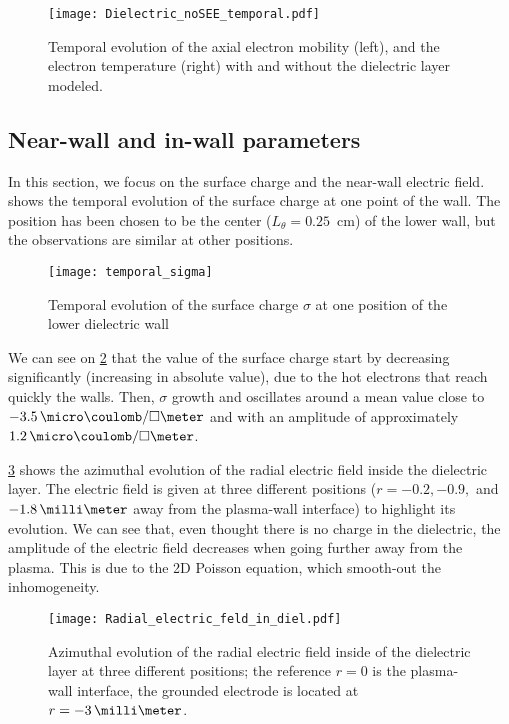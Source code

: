   \begin{figure}[hbt]
    \centering
    \texttt{[image: Dielectric\_noSEE\_temporal.pdf]}
    \caption{Temporal evolution of the axial electron mobility (left), and the electron temperature (right) with and without the dielectric layer modeled.}
    \label{fig-mod_diel_comp}
  \end{figure}

  
  \subsection{Near-wall and in-wall parameters} \label{subsec-nearwall}
    In this section, we focus on the surface charge and the near-wall electric field.
     shows the temporal evolution of the surface charge at one point of the wall.
    The position has been chosen to be the center ($L_{\theta} = 0.25$~cm) of the lower wall, but the observations are similar at other positions.
     
    \begin{figure}[hbt]
      \centering
      \texttt{[image: temporal\_sigma]}
      \caption{Temporal evolution of the surface charge $\sigma$ at one position of the lower dielectric wall}
      \label{fig-sigma_time}
    \end{figure}

    We can see on \cref{fig-sigma_time} that the value of the surface charge start by decreasing significantly (increasing in absolute value), due to the hot electrons that reach quickly the walls.
    Then, $\sigma$ growth and oscillates around a mean value close to $-3.5 \,\micro\coulomb/\square\meter$ and with an amplitude of approximately $1.2 \,\micro\coulomb/\square\meter$.
    
    \cref{fig-indiel} shows the azimuthal evolution of the radial electric field inside the dielectric layer.
    The electric field is given at three different positions ($r=-0.2, -0.9,$ and $-1.8\,\milli\meter$ away from the plasma-wall interface) to highlight its evolution.
    We can see that, even thought there is no charge in the dielectric, the amplitude of the electric field decreases when going further away from the plasma.
    This is due to the \ac{2D} Poisson equation, which smooth-out the inhomogeneity.
     
    \begin{figure}[hbt]
      \centering
      \texttt{[image: Radial\_electric\_feld\_in\_diel.pdf]}
      \caption{Azimuthal evolution of the radial electric field inside of the dielectric layer at three different positions; the reference $r=0$ is the plasma-wall interface, the grounded electrode is located at $r=-3\,\milli\meter$.}
      \label{fig-indiel}
    \end{figure}

